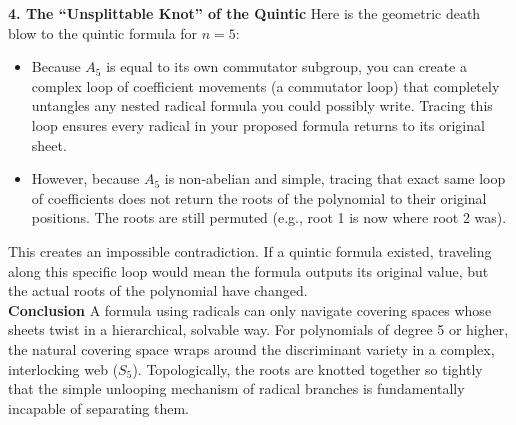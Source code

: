 {\bf 4. The ``Unsplittable Knot'' of the Quintic}
Here is the geometric death blow to the quintic formula for \(n = 5\):
\begin{itemize}
\item[]Because \(A_{5}\) is equal to its own commutator subgroup, you can create a complex loop of coefficient movements (a commutator loop)
that completely untangles any nested radical formula you could possibly write. 
Tracing this loop ensures every radical in your proposed formula returns to its original sheet.
\item[]However, because \(A_{5}\) is non-abelian and simple, tracing that exact same loop of coefficients does not return the roots of the polynomial to their original positions. 
The roots are still permuted (e.g., root 1 is now where root 2 was).
\end{itemize}
This creates an impossible contradiction. If a quintic formula existed, traveling along this specific loop would mean the formula outputs its original value, but the actual roots of the polynomial have changed.\\

{\bf Conclusion}
A formula using radicals can only navigate covering spaces whose sheets twist in a hierarchical, solvable way. 
For polynomials of degree 5 or higher, the natural covering space wraps around the discriminant variety in a complex, interlocking web (\(S_{5}\)). 
Topologically, the roots are knotted together so tightly that the simple unlooping mechanism of radical branches is fundamentally incapable of separating them.